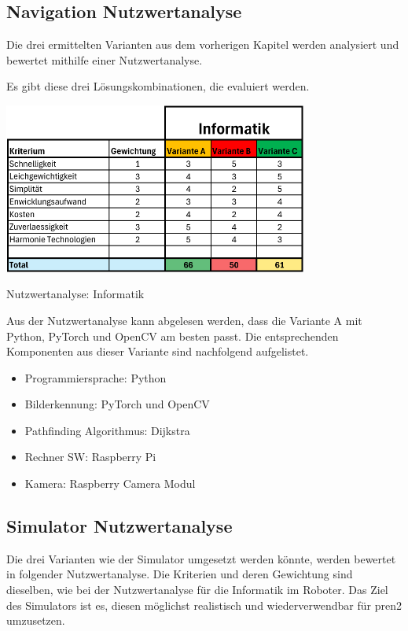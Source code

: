 \subsection{Navigation Nutzwertanalyse}

Die drei ermittelten Varianten aus dem vorherigen Kapitel werden analysiert und bewertet mithilfe einer Nutzwertanalyse.

Es gibt diese drei Lösungskombinationen, die evaluiert werden.



\begin{table}[H]
\centering
\includegraphics[width=0.75\textwidth]{assets/Nutzwertanalyse-I.pdf}
\caption{Nutzwertanalyse: Informatik}
\label{table:nutzwert-informatik}
\end{table}

Aus der Nutzwertanalyse kann abgelesen werden, dass die Variante A mit Python, PyTorch und OpenCV am besten passt. Die entsprechenden Komponenten aus dieser Variante sind nachfolgend aufgelistet.

\begin{itemize}
    \item Programmiersprache: Python
    \item Bilderkennung: PyTorch und OpenCV
    \item Pathfinding Algorithmus: Dijkstra
    \item Rechner SW: Raspberry Pi
    \item Kamera: Raspberry Camera Modul
\end{itemize}

\subsection{Simulator Nutzwertanalyse}

Die drei Varianten wie der Simulator umgesetzt werden könnte, werden bewertet in folgender Nutzwertanalyse. Die Kriterien und deren Gewichtung sind dieselben, wie bei der Nutzwertanalyse für die Informatik im Roboter. Das Ziel des Simulators ist es, diesen möglichst realistisch und wiederverwendbar für \acrshort{pren2} umzusetzen.


